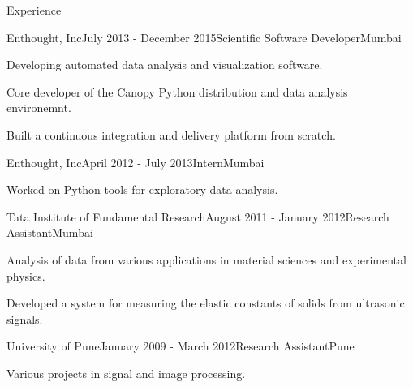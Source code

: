 \documentclass{resume} %
\begin{document}
\begin{rSection}{Experience}
\begin{rSubsection}{Enthought, Inc}{July 2013 - December 2015}{Scientific
    Software Developer}{Mumbai}
\item Developing automated data analysis and visualization software.
\item Core developer of the Canopy Python distribution and data analysis
    environemnt.
\item Built a continuous integration and delivery platform from scratch.
\end{rSubsection}

\begin{rSubsection}{Enthought, Inc}{April 2012 - July 2013}{Intern}{Mumbai}
\item Worked on Python tools for exploratory data analysis.
\end{rSubsection}

\begin{rSubsection}{Tata Institute of Fundamental Research}{August 2011 -
    January 2012}{Research Assistant}{Mumbai}
\item Analysis of data from various applications in material sciences and
    experimental physics.
\item Developed a system for measuring the elastic constants of solids from
    ultrasonic signals.
\end{rSubsection}

\begin{rSubsection}{University of Pune}{January 2009 - March 2012}{Research
    Assistant}{Pune}
\item Various projects in signal and image processing.
\end{rSubsection}

\end{rSection}
\end{document}
